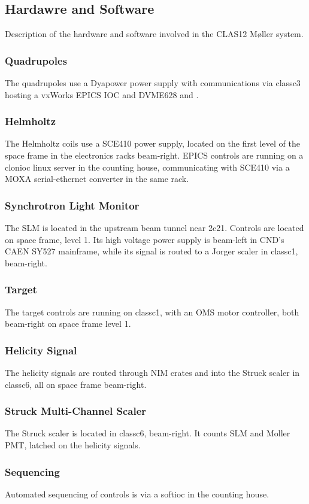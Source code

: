 \documentclass[amsmath,amssymb,notitlepage,12pt]{revtex4}
\begin{document}
\newpage
\begin{appendices}
%

\newpage
\section{Hardawre and Software}
Description of the hardware and software involved in the CLAS12 M{\o}ller system.
\subsubsection{Quadrupoles}
The quadrupoles use a Dyapower power supply with communications via classc3 hosting a vxWorks EPICS IOC and DVME628 and .
\subsubsection{Helmholtz}
The Helmholtz coils use a SCE410 power supply, located on the first level of the space frame in the electronics racks beam-right.  EPICS controls are running on a clonioc linux server in the counting house, communicating with SCE410 via a MOXA serial-ethernet converter in the same rack. 
\subsubsection{Synchrotron Light Monitor}
The SLM is located in the upstream beam tunnel near 2c21.  Controls are located on space frame, level 1.  Its high voltage power supply is beam-left in CND's  CAEN SY527 mainframe, while its signal is routed to a Jorger scaler in classc1, beam-right.
\subsubsection{Target}
The target controls are running on classc1, with an OMS motor controller, both beam-right on space frame level 1.
\subsubsection{Helicity Signal}
The helicity signals are routed through NIM crates and into the Struck scaler in classc6, all on space frame beam-right. 
\subsubsection{Struck Multi-Channel Scaler}
The Struck scaler is located in classc6, beam-right.  It counts SLM and Moller PMT, latched on the helicity signals.
\subsubsection{Sequencing}
Automated sequencing of controls is via a softioc in the counting house.
\end{appendices}
\end{document}
